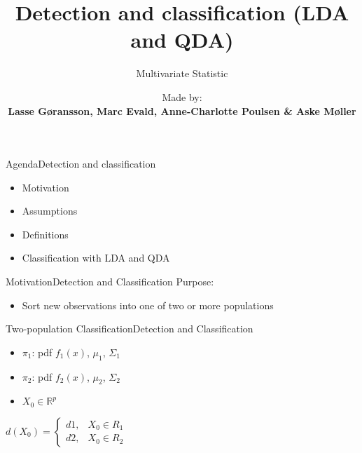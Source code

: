 \documentclass[aspectratio=169,10pt,t]{beamer}
\title{Detection and classification (LDA and QDA)}
\subtitle{Multivariate Statistic}
\date{ }
\author{
	Made by: \\
	\textbf{Lasse Gøransson, Marc Evald, Anne-Charlotte Poulsen \& Aske Møller}
}
\institute[
  SDU Robotics\\
  The Maersk Mc-Kinney Moller Institute\\
  University of Southern Denmark
] %
{%
  SDU Robotics\\
  The Maersk Mc-Kinney Moller Institute\\
  University of Southern Denmark

}
\begin{document}
{\SDUwavesbg%
\begin{frame} %
  \titlepage
\end{frame}}

\begin{frame}{Agenda}{Detection and classification}{\vphantom{(y}}
\begin{itemize}
    \item Motivation
		\item Assumptions 
		\item Definitions
		\item Classification with LDA and QDA
\end{itemize}
\end{frame}

\setcounter{page}{1}
\begin{frame}{Motivation}{Detection and Classification}
    Purpose: 
    \begin{itemize}
        \item Sort new observations into one of two or more populations
    \end{itemize}
\end{frame}

\begin{frame}{Two-population Classification}{Detection and Classification}
    \begin{itemize}
        \item $\pi_1$: pdf $f_1(x)$, $\mu_1$, $\Sigma_1$
        \item $\pi_2$: pdf $f_2(x)$, $\mu_2$, $\Sigma_2$
				\item $X_0 \in \mathbb{R}^p$ \\
    \end{itemize}

		\vspace{2cm}

    \quad $d(X_0) = \begin{cases} d1, &X_0 \in R_1 \\ d2, &X_0 \in R_2 \end{cases}$ \\
\end{frame}
\end{document}

